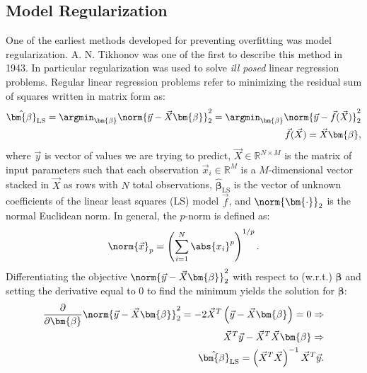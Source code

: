 \subsection{Model Regularization}
\label{subsec:regularization}
One of the earliest methods developed for preventing overfitting was model regularization. A. N. Tikhonov \citep{tikhonovStabilityInverseProblems1943} was one of the first to describe this method in \num{1943}. In particular regularization was used to solve \emph{ill posed} linear regression problems. Regular linear regression problems refer to minimizing the residual sum of squares written in matrix form as:
\begin{equation}
  \begin{split}
    \hat{\bm{\beta}}_{\mathrm{LS}} = \argmin_{\bm{\beta}} \norm{\vec{y} - \vec{X} \bm{\beta} }_2^2 = \argmin_{\bm{\beta}} \norm{ \vec{y} - \vec{f}(\vec{X}) }_2^2 \\
    \vec{f}(\vec{X}) = \vec{X} \bm{\beta},
  \end{split}
\end{equation}
where $\vec{y}$ is vector of values we are trying to predict, $\vec{X}\in\mathbb{R}^{N\times M}$ is the matrix of input parameters such that each observation $\vec{x}_i \in \mathbb{R}^M$ is a $M$-dimensional vector stacked in $\vec{X}$ as rows with $N$ total observations, $\hat{\bm{\beta}}_{\mathrm{LS}}$ is the vector of unknown coefficients of the linear least squares (LS) model $\vec{f}$, and $\norm{ \bm{\cdot} }_2$ is the normal Euclidean norm. In general, the $p$-norm is defined as:
\begin{equation}
  \norm{\vec{x}}_p = \left( \sum_{i=1}^N \abs{x_i}^p \right)^{1/p}.
\end{equation}
Differentiating the objective $\norm{\vec{y} - \vec{X} \bm{\beta} }_2^2$ with respect to (w.r.t.) $\bm{\beta}$ and setting the derivative equal to $0$ to find the minimum yields the solution for $\bm{\beta}$:
\begin{equation}
  \begin{split}
    \frac{\partial}{\partial \bm{\beta}} \norm{\vec{y} - \vec{X} \bm{\beta} }_2^2 = -2 \vec{X}^T \left( \vec{y} - \vec{X} \bm{\beta} \right) = 0  \Rightarrow \\
    \vec{X}^T \vec{y} - \vec{X}^T \vec{X} \bm{\beta} \Rightarrow \\
    \hat{\bm{\beta}}_{\mathrm{LS}} =  \left( \vec{X}^T \vec{X} \right)^{-1} \vec{X}^T \vec{y}.
  \end{split}
\end{equation}
